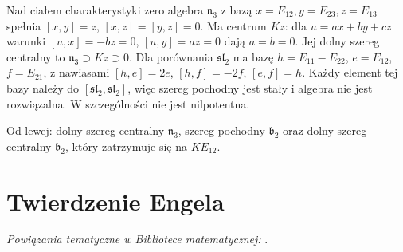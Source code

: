 \begin{przyklad}
\label{aa:prz:heisenberg-sl2}
Nad ciałem charakterystyki zero algebra
$\mathfrak n_3$ z bazą $x=E_{12},y=E_{23},z=E_{13}$
spełnia $[x,y]=z$, $[x,z]=[y,z]=0$.
Ma centrum $Kz$: dla $u=ax+by+cz$ warunki
$[u,x]=-bz=0$, $[u,y]=az=0$ dają $a=b=0$.
Jej dolny szereg centralny to
$\mathfrak n_3\supset Kz\supset0$.
Dla porównania $\mathfrak{sl}_2$ ma bazę
$h=E_{11}-E_{22}$, $e=E_{12}$, $f=E_{21}$,
z nawiasami $[h,e]=2e$, $[h,f]=-2f$, $[e,f]=h$.
Każdy element tej bazy należy do
$[\mathfrak{sl}_2,\mathfrak{sl}_2]$, więc szereg
pochodny jest stały i algebra nie jest rozwiązalna.
W szczególności nie jest nilpotentna.
\end{przyklad}

\begin{center}

\small Od lewej: dolny szereg centralny $\mathfrak n_3$,
szereg pochodny $\mathfrak b_2$ oraz dolny szereg
centralny $\mathfrak b_2$, który zatrzymuje się na $KE_{12}$.
\end{center}

\section{Twierdzenie Engela}

\noindent\emph{Powiązania tematyczne w Bibliotece matematycznej:} .


